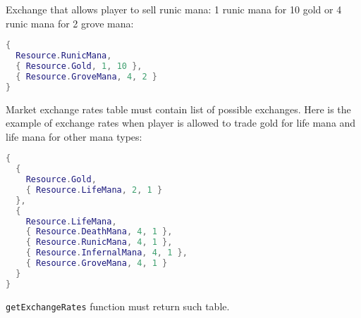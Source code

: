 Exchange that allows player to sell runic mana: 1 runic mana for 10 gold or 4 runic mana for 2 grove mana:
\begin{center}
\begin{lstlisting}[language=Lua]
{
  Resource.RunicMana,
  { Resource.Gold, 1, 10 },
  { Resource.GroveMana, 4, 2 }
}
\end{lstlisting}
\end{center}
Market exchange rates table must contain list of possible exchanges. Here is the example of exchange rates when player is allowed to trade gold for life mana and life mana for other mana types:
\begin{center}
\begin{lstlisting}[language=Lua]
{
  {
    Resource.Gold,
    { Resource.LifeMana, 2, 1 }
  },
  {
    Resource.LifeMana,
    { Resource.DeathMana, 4, 1 },
    { Resource.RunicMana, 4, 1 },
    { Resource.InfernalMana, 4, 1 },
    { Resource.GroveMana, 4, 1 }
  }
}
\end{lstlisting}
\end{center}
\texttt{getExchangeRates} function must return such table.\\

